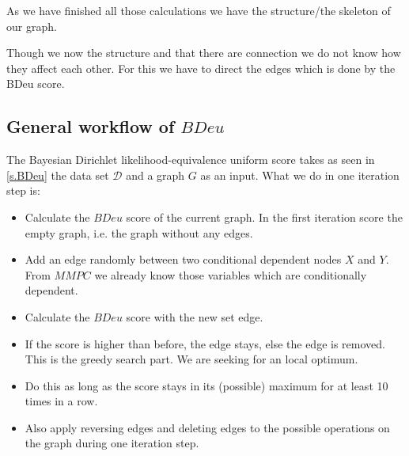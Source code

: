			As we have finished all those calculations we have the structure/the skeleton of our graph.
			
			 \label{img.skeleton}

			Though we now the structure and that there are connection we do not know how they affect each other. For this we have to direct the edges which is done by the BDeu score.

		\subsection{General workflow of $BDeu$}

			The Bayesian Dirichlet likelihood-equivalence uniform score takes as seen in \autoref{s.BDeu} the data set $\mathcal{D}$ and a graph $G$ as an input. What we do in one iteration step is:

			\begin{itemize}
				\item Calculate the $BDeu$ score of the current graph. In the first iteration score the empty graph, i.e. the graph without any edges.
				\item Add an edge randomly between two conditional dependent nodes $X$ and $Y$. From $MMPC$ we already know those variables which are conditionally dependent.
				\item Calculate the $BDeu$ score with the new set edge.
				\item If the score is higher than before, the edge stays, else the edge is removed. This is the greedy search part. We are seeking for an local optimum.
				\item Do this as long as the score stays in its (possible) maximum for at least 10 times in a row.
				\item Also apply reversing edges and deleting edges to the possible operations on the graph during one iteration step.
			\end{itemize}


			 \label{img.empty}

			 \label{img.add}

			 \label{img.reverse}

